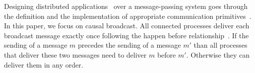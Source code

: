 

Designing distributed
applications~\cite{nakamoto2009bitcoin,nedelec2016crate,shapiro2011comprehensive}
over a message-passing system goes through the definition and the implementation
of appropriate communication primitives~\cite{hadzilacos1994modular}.  In this
paper, we focus on causal broadcast.
All connected processes deliver each broadcast message exactly once following
the happen before relationship~\cite{lamport1978time,schwarz1994detecting}. If
the sending of a message $m$ precedes the sending of a message $m'$ than all
processes that deliver these two messages need to deliver $m$ before
$m'$. Otherwise they can deliver them in any order.


